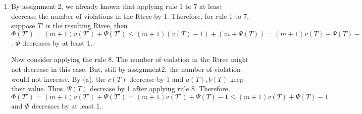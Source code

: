 \documentclass[10pt]{article}
\begin{document}
\begin{enumerate}
\begin{enumerate}
\begin{addmargin}[1em]{0em}
\begin{addmargin}[1em]{0em}
						\textit{Case 1:} $z$'s two children have weight 0, and
						$y$'s sibling has 0 weight.
						\begin{addmargin}[1em]{0em}
							Same as (a) Case 1.
						\end{addmargin}
						\textit{Case 2:} $z$'s two children have weight 0, and
						$y$'s sibling has positive weight.
						\begin{addmargin}[1em]{0em}
							Then, $a(T') = a(T)$, since the sibling of $y$ was
							a child of $u$ instead of $z$.
							$b(T') = b(T)+1$.
							$c(T') = c(T)$ if the sibling of $y$ has weight 1,
							or otherwise, $c(T') = c(T)-1$.
							Thus, $\Psi$ at most increases by 2.
						\end{addmargin}
						\textit{Case 3:} Otherwise.
						\begin{addmargin}[1em]{0em}
							$a(T')$ always less than or equal to $a(T)$. 
							Similar to (a) Casa 3, $b(T)$ at most increases by
							2 and $c(T)$ at most increases by 2.
							Thus, $\Psi$ at most increases by 6.
						\end{addmargin}
						Hence, $\Psi$ at most increases by 6.
					\end{addmargin}
					Combine both (a) and (b), we can conclude that the maximum
					increament on $\Psi$ is 6 for rule 7.
				\end{addmargin}
				\textit{Rule 8:}
				\begin{addmargin}[1em]{0em}
					In this case, $\Psi$ can not increase, since $c(T)$ always decrease by 1 and $a(T), b(T)$ keep their value.
				\end{addmargin}

				Combining all 8 reblancing rules, the maximum amount $\Psi$ can
				increase as the result of the application of one revalancing
				rule is 6. 
				Thus the upper bound $m=6$.

			\item
				By assignment 2, we already known that applying rule 1 to 7 at least decrease the number of violations in the Rtree by 1.
				Therefore, for rule 1 to 7, suppose $T'$ is the resulting Rtree, then $\Phi(T') = (m+1)v(T') + \Psi(T') \leq (m+1)(v(T) - 1) + (m + \Psi(T)) = (m+1)v(T) + \Psi(T) - 1$.
				$\Phi$ decreases by at least 1.

				Now consider applying the rule 8. 
				The number of violation in the Rtree might not decrease in this case. 
				But, still by assignment2, the number of violation would not increase.
				By (a), the $c(T)$ decrease by 1 and $a(T), b(T)$ keep their value.
				Thus, $\Psi(T)$ decrease by 1 after applying rule 8.
				Therefore, $\Phi(T') = (m+1)v(T') + \Psi(T') = (m+1)v(T') + \Psi(T)-1 \leq (m+1)v(T) + \Psi(T) - 1$ and $\Phi$ decreases by at least 1.


\end{enumerate}
\end{enumerate}
\end{document}
